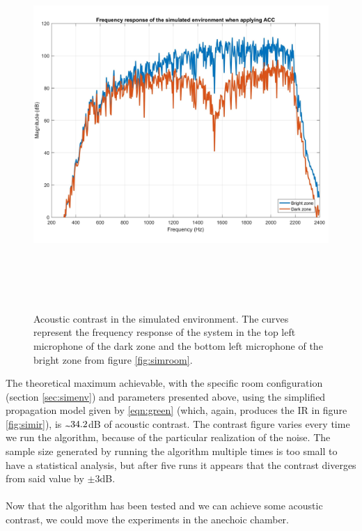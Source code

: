 \begin{figure}[H]
\centering
\includegraphics[width=14cm,height=14cm,keepaspectratio]{Figures/contrast_simir}
\decoRule
\caption[Acoustic contrast in the simulated environment.]{Acoustic contrast in the simulated environment. The curves represent the frequency response of the system in the top left microphone of the dark zone and the bottom left microphone of the bright zone from figure \ref{fig:simroom}.}
\label{fig:contrast_simir}
\end{figure}

The theoretical maximum achievable, with the specific room configuration (section \ref{sec:simenv}) and parameters presented above, using the simplified propagation model given by \ref{eqn:green} (which, again, produces the IR in figure \ref{fig:simir}), is $\tld 34.2$dB of acoustic contrast. The contrast figure varies every time we run the algorithm, because of the particular realization of the noise. The sample size generated by running the algorithm multiple times is too small to have a statistical analysis, but after five runs it appears that the contrast diverges from said value by $\pm3$dB.
\\
\\
Now that the algorithm has been tested and we can achieve some acoustic contrast, we could move the experiments in the anechoic chamber.

